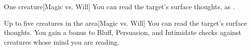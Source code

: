 \begin{spellheader}
    \spellrng{\rngmed}
\end{spellheader}
\begin{spelleffects}
    \begin{spelltarget}{One creature}[Magic vs. Will]
        \spelleffect You can read the target's surface thoughts, as .
    \end{spelltarget}
\end{spelleffects}

\begin{spellheader}
\end{spellheader}
\begin{spelleffects}
    \begin{spelltargets}{Up to five creatures in the area}[Magic vs. Will]
        \spellsuccess You can read the target's surface thoughts. You gain a  bonus to Bluff, Persuasion, and Intimidate checks against creatures whose mind you are reading.
    \end{spelltargets}
\end{spelleffects}

